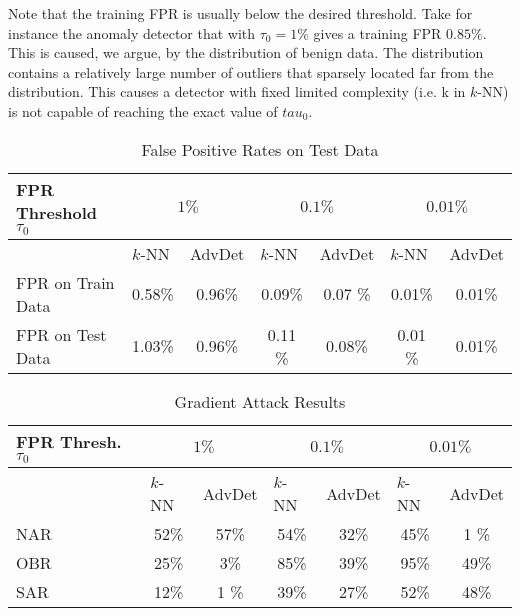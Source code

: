 Note that the training FPR is usually below the desired threshold. Take for instance the anomaly detector that with $\tau_0 = 1\%$ gives a training FPR $ 0.85 \%$.
This is caused, we argue, by the distribution of benign data. The distribution contains a relatively large number of outliers that sparsely located far from the distribution. This causes a detector with fixed limited complexity (i.e. k in $k$-NN) is not capable of reaching the exact value of $tau_0$.

\begin{table}[h]
\centering

    \begin{tabular}{|l||c|c|c|c|c|c|}
    \hline
    FPR Threshold $\tau_0$        & \multicolumn{2}{c|}{$1\%$}              & \multicolumn{2}{c|}{$0.1\%$}            & \multicolumn{2}{c|}{$0.01\%$}           \\ \hline
                              & \multicolumn{1}{l|}{$k$-NN} & AdvDet & \multicolumn{1}{l|}{$k$-NN} & AdvDet & \multicolumn{1}{l|}{$k$-NN} & AdvDet \\ \hline\hline
    FPR on Train Data & 0.58\% & 0.96\% & 0.09\% & 0.07 \% & 0.01\% & 0.01\% \\ \hline
    FPR on Test Data & 1.03\% & 0.96\% & 0.11 \% & 0.08\% & 0.01 \% & 0.01\% \\ \hline
    \end{tabular}

    \caption{False Positive Rates on Test Data}
    \label{tab:false_positives_rate}

\end{table}


\begin{table}[h]
\centering

    \begin{tabular}{|l||c|c|c|c|c|c|}
    \hline
    FPR Thresh. $\tau_0$        & \multicolumn{2}{c|}{$1\%$}              & \multicolumn{2}{c|}{$0.1\%$}            & \multicolumn{2}{c|}{$0.01\%$}           \\ \hline
                              & \multicolumn{1}{l|}{$k$-NN} & AdvDet & \multicolumn{1}{l|}{$k$-NN} & AdvDet & \multicolumn{1}{l|}{$k$-NN} & AdvDet \\ \hline\hline

    NAR & 52\% & 57\% & 54\% & 32\% & 45\% & 1 \% \\ \hline
    OBR & 25\% & 3\% & 85\% & 39\% & 95\% & 49\% \\ \hline
    SAR & 12\% & 1 \% & 39\% & 27\% & 52\% & 48\% \\ \hline

    \end{tabular}

    \caption{Gradient Attack Results}
    \label{tab:gradient_attack_results}

\end{table}


